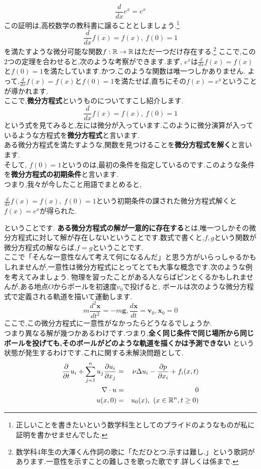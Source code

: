 \thm
\[
\frac{d}{dx} e^x = e^x
\]
\thmx
この証明は,高校数学の教科書に譲ることとしましょう.\footnote{正しいことを書きたいという数学科生としてのプライドのようなものが私に証明を書かせませんでした.}
\thm
\[
\frac{d}{dx} f(x) = f(x) ,\ f(0) = 1
\]
を満たすような微分可能な関数$f:\mathbb R \to \mathbb R$はただ一つだけ存在する.\footnote{数学科4年生の大澤くん作詞の歌に「ただひとつ.示すは難し.」という歌詞があります.一意性を示すことの難しさを歌った歌です.詳しくは係まで.}
\thmx
{}
ここで,この$2$つの定理を合わせると,次のような考察ができます.まず,
$e^x$は$\frac{d}{dx}f(x) = f(x)$と$f(0)=1$を満たしています.かつ.このような関数は唯一つしかありません.
よって,$\frac{d}{dx}f(x) = f(x)$と$f(0)=1$を満たせば,直ちにその$f(x) = e^x$ということが導かれます.\\
ここで,{\bf 微分方程式}というものについてすこし紹介します.\\
\[
\frac{d}{dx} f(x) = f(x) ,\ f(0) = 1
\]
という式を見てみると,左には微分が入っています.このように微分演算が入っているような方程式を{\bf 微分方程式}と言います.\\
ある微分方程式を満たすような,関数を見つけることを{\bf 微分方程式を解く}と言います.\\
そして, $f(0) = 1$というのは,最初の条件を指定しているのです.このような条件を{\bf 微分方程式の初期条件}と言います.\\
つまり,我々が今したこと用語でまとめると,
\begin{center}
$\frac{d}{dx} f(x) = f(x) ,\ f(0) = 1$という初期条件の課された微分方程式解くと$f(x) = e^x$が得られた.
\end{center}ということです.
{\bf ある微分方程式の解が一意的に存在する}とは,唯一つしかその微分方程式に対して解が存在しないということです.数式で書くと,$f,g$という関数が微分方程式の解ならば,$f=g$ということです.\\
ここで「そんな一意性なんて考えて何になるんだ」と思う方がいらっしゃるかもしれませんが,一意性は微分方程式にとってとても大事な概念です.次のような例を考えてみましょう.
\ex
物理を習ったことがある人ならばピンとくるかもしれませんが,ある地点$O$からボールを初速度$v_0$で投げると,
ボールは次のような微分方程式で定義される軌道を描いて運動します.
\[
m \frac{d^2 \bm{x} }{dt^2}  = -m \bm{g}, \frac{d  \bm{x}}{dt} = \bm{v}_0 , \bm{x}_0 = 0 
\]
ここで,この微分方程式に一意性がなかったらどうなるでしょうか.\\
つまり異なる解が幾つかあるわけです.つまり,{\bf 全く同じ条件で同じ場所から同じボールを投げても,そのボールがどのような軌道を描くかは予測できない}
という状態が発生するわけです.これに関する未解決問題として.
\begin{eqnarray*}
\frac{\partial}{\partial t}u_i + \sum_{j=1}^n u_j \frac{\partial u_i}{\partial x_j}
&=& \nu \Delta u_i - \frac{\partial p}{\partial x_i} + f_i(x,t)\\
\nabla \cdot u &=& 0\\
u(x,0) &=& u_0(x)  , \ (x\in \mathbb R^n, t \ge 0)
\end{eqnarray*}

